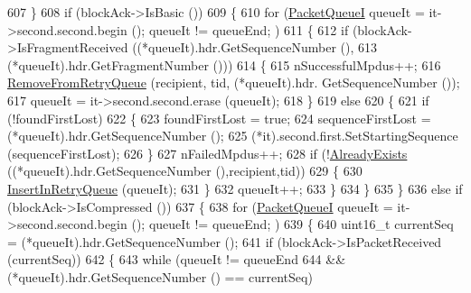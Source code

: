 \begin{DoxyCode}
607             \}
608           \textcolor{keywordflow}{if} (blockAck->IsBasic ())
609             \{
610               \textcolor{keywordflow}{for} (\hyperlink{classns3_1_1BlockAckManager_a2bb94802381e70535e8a7c892fd01d48}{PacketQueueI} queueIt = it->second.second.begin (); queueIt != queueEnd; )
611                 \{
612                   \textcolor{keywordflow}{if} (blockAck->IsFragmentReceived ((*queueIt).hdr.GetSequenceNumber (),
613                                                     (*queueIt).hdr.GetFragmentNumber ()))
614                     \{
615                       nSuccessfulMpdus++;
616                       \hyperlink{classns3_1_1BlockAckManager_aa7fc7ecdb5e0171b0e84bb39554f75e2}{RemoveFromRetryQueue} (recipient, tid, (*queueIt).hdr.
      GetSequenceNumber ());
617                       queueIt = it->second.second.erase (queueIt);
618                     \}
619                   \textcolor{keywordflow}{else}
620                     \{
621                       \textcolor{keywordflow}{if} (!foundFirstLost)
622                         \{
623                           foundFirstLost = \textcolor{keyword}{true};
624                           sequenceFirstLost = (*queueIt).hdr.GetSequenceNumber ();
625                           (*it).second.first.SetStartingSequence (sequenceFirstLost);
626                         \}
627                       nFailedMpdus++;
628                       \textcolor{keywordflow}{if} (!\hyperlink{classns3_1_1BlockAckManager_a36a1c566d4039034d22b9afead55c199}{AlreadyExists} ((*queueIt).hdr.GetSequenceNumber (),recipient,tid))
629                         \{
630                           \hyperlink{classns3_1_1BlockAckManager_aa09e2e2b119ed7a054a580971cf950e3}{InsertInRetryQueue} (queueIt);
631                         \}
632                       queueIt++;
633                     \}
634                 \}
635             \}
636           \textcolor{keywordflow}{else} \textcolor{keywordflow}{if} (blockAck->IsCompressed ())
637             \{
638               \textcolor{keywordflow}{for} (\hyperlink{classns3_1_1BlockAckManager_a2bb94802381e70535e8a7c892fd01d48}{PacketQueueI} queueIt = it->second.second.begin (); queueIt != queueEnd; )
639                 \{
640                   uint16\_t currentSeq = (*queueIt).hdr.GetSequenceNumber ();
641                   \textcolor{keywordflow}{if} (blockAck->IsPacketReceived (currentSeq))
642                     \{
643                       \textcolor{keywordflow}{while} (queueIt != queueEnd
644                              && (*queueIt).hdr.GetSequenceNumber () == currentSeq)

\end{DoxyCode}
